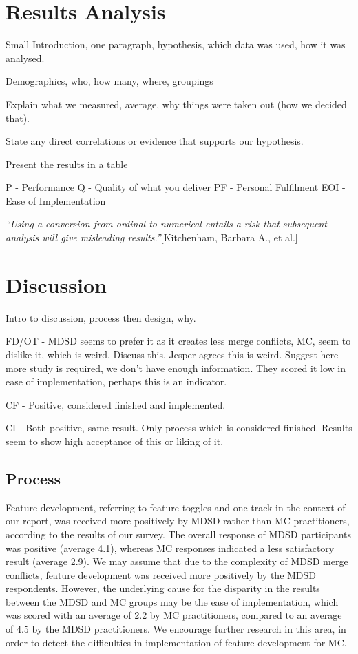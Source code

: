 \documentclass[final_report_innit.tex]{subfiles}
\begin{document}
\section{Results Analysis}

Small Introduction, one paragraph, hypothesis, which data was used, how it was analysed.

Demographics, who, how many, where, groupings

Explain what we measured, average, why things were taken out (how we decided that).

State any direct correlations or evidence that supports our hypothesis.

Present the results in a table

P - Performance
Q - Quality of what you deliver
PF - Personal Fulfilment
EOI - Ease of Implementation

\textit{``Using a conversion from ordinal to numerical entails a risk that subsequent analysis will give misleading results.''}[Kitchenham, Barbara A., et al.]

\section{Discussion}

Intro to discussion, process then design, why.



FD/OT - MDSD seems to prefer it as it creates less merge conflicts, MC, seem to dislike it, which is weird. Discuss this. Jesper agrees this is weird. Suggest here more study is required, we don't have enough information. They scored it low in ease of implementation, perhaps this is an indicator.

CF - Positive, considered finished and implemented. 

CI - Both positive, same result. Only process which is considered finished. Results seem to show high acceptance of this or liking of it.

\subsection*{Process}

Feature development, referring to feature toggles and one track in the context of our report, was received more positively by MDSD rather than MC practitioners, according to the results of our survey. The overall response of MDSD participants was positive (average 4.1), whereas MC responses indicated a less satisfactory result (average 2.9). We may assume that due to the complexity of MDSD merge conflicts, feature development was received more positively by the MDSD respondents. However, the underlying cause for the disparity in the results between the MDSD and MC groups may be the ease of implementation, which was scored with an average of 2.2 by MC practitioners, compared to an average of 4.5 by the MDSD practitioners. We encourage further research in this area, in order to detect the difficulties in implementation of feature development for MC.
\end{document}
